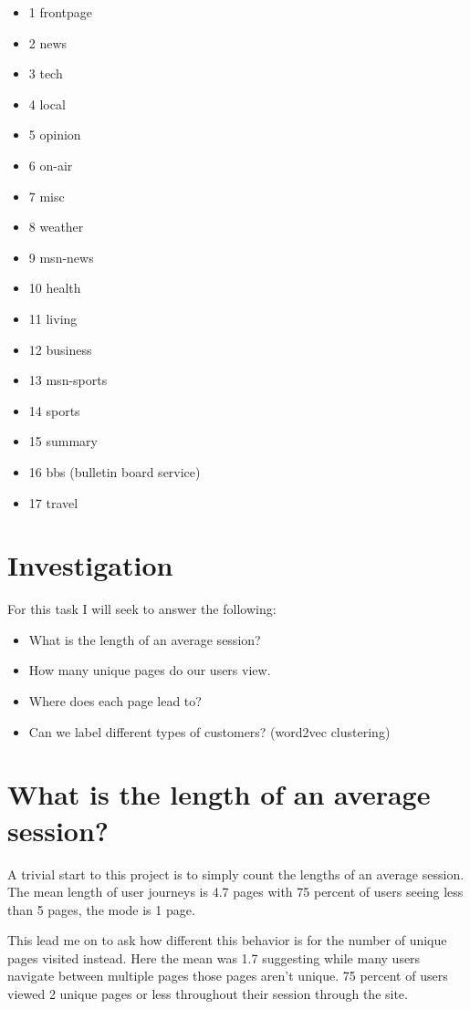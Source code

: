 \documentclass{article}
\begin{document}
\begin{itemize}
\item 1 frontpage
\item 2 news
\item 3 tech
\item 4 local
\item 5 opinion
\item 6 on-air
\item 7 misc
\item 8 weather
\item 9 msn-news
\item 10 health
\item 11 living
\item 12 business
\item 13 msn-sports
\item 14 sports
\item 15 summary
\item 16 bbs (bulletin board service)
\item 17 travel
\end{itemize}

\section{Investigation}
For this task I will seek to answer the following:
\begin{itemize}
\item What is the length of an average session?
\item How many unique pages do our users view.
\item Where does each page lead to?
\item Can we label different types of customers? (word2vec clustering)
\end{itemize}

\section{What is the length of an average session?}
A trivial start to this project is to simply count the lengths of an average session. The mean length of user journeys is 4.7 pages with 75 percent of users seeing less than 5 pages, the mode is 1 page.

This lead me on to ask how different this behavior is for the number of unique pages visited instead. Here the mean was 1.7 suggesting while many users navigate between multiple pages those pages aren't unique. 75 percent of users viewed 2 unique pages or less throughout their session through the site.
\end{document}
